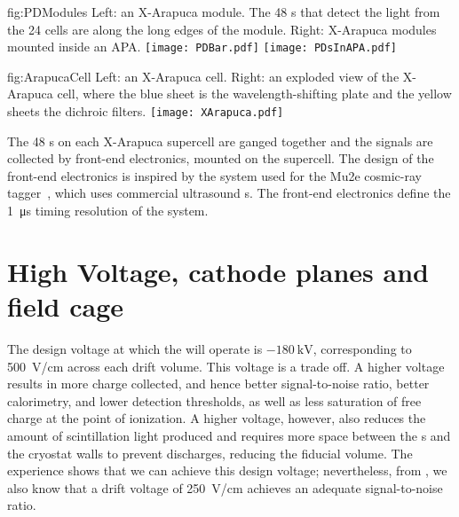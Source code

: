 \begin{dunefigure}{fig:PDModules}
{Left: an X-Arapuca  module. The 48 s that detect the light from the 24 cells are along the long edges of the module. Right: X-Arapuca  modules mounted inside an APA.}
\texttt{[image: PDBar.pdf]}
\texttt{[image: PDsInAPA.pdf]}
\end{dunefigure}

\begin{dunefigure}{fig:ArapucaCell}
{Left: an X-Arapuca cell. Right: an exploded view of the X-Arapuca cell, where the blue sheet is the wavelength-shifting plate and the yellow sheets the dichroic filters.}
\texttt{[image: XArapuca.pdf]}
\end{dunefigure}

The 48 s on each X-Arapuca supercell are ganged together and the signals are collected by front-end electronics, mounted on the supercell. The design of the front-end electronics is inspired by the system used for the Mu2e cosmic-ray tagger~\cite{bib:mu2e_tdr}, which uses commercial ultrasound s. The front-end electronics define the \SI{1}{\micro\second} timing resolution of the  system.

\section{High Voltage, cathode planes and field cage}
\label{sec:fdsp-exec-hv}

The design voltage at which the   will operate is $-\SI{180}{\kilo\volt}$, corresponding to \SI{500}{\volt/\cm} across each drift volume. This voltage is a trade off. A higher voltage results in more charge collected, and hence better signal-to-noise ratio, better calorimetry, and lower detection thresholds, as well as less saturation of free charge at the point of ionization. A higher voltage, however, also reduces the amount of scintillation light produced and requires more space between the s and the cryostat walls to prevent discharges, reducing the fiducial volume. The  experience shows that we can achieve this design voltage; nevertheless, from , we also know that a drift voltage of \SI{250}{\volt/\cm} achieves an adequate signal-to-noise ratio.

